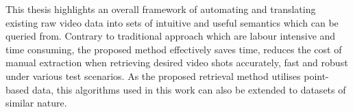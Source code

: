 This thesis highlights an overall framework of automating and translating existing raw video data into sets of intuitive and useful semantics which can be queried from. Contrary to traditional approach which are labour intensive and time consuming, the proposed method effectively saves time, reduces the cost of manual extraction when retrieving desired video shots accurately, fast and robust under various test scenarios. As the proposed retrieval method utilises point-based data, this algorithms used in this work can also be extended to datasets of similar nature.


